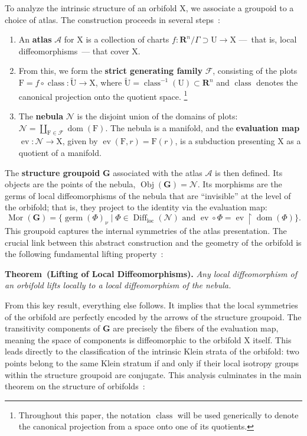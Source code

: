 \documentclass[10pt,reqno,letterpaper,twoside]{amsart}
\theoremstyle{article}
\newenvironment{theorem}[1]%
{\noindent\textbf{Theorem#1.} \it}%
{}
\newcommand{\RR}{\mathbf{R}}
\newcommand{\GG}{\mathbf{G}}
\newcommand{\cA}{{\mathcal A}}
\newcommand{\cF}{{\mathcal F}}
\newcommand{\cN}{{\mathcal N}}
\def \F{\mathrm F}
\def \U{\mathrm U}
\def \X{\mathrm X}
\DeclareMathOperator{\class}{class}
\DeclareMathOperator{\Diff}{Diff}
\DeclareMathOperator{\dom}{dom}
\DeclareMathOperator{\ev}{ev}
\DeclareMathOperator{\germ}{germ}
\newcommand{\loc}{\mathrm{loc}}
\newcommand{\Obj}{\operatorname{Obj}}
\newcommand{\Mor}{\operatorname{Mor}}
\begin{document}
  To analyze the intrinsic structure of an orbifold $\X$, we associate a groupoid to a choice of atlas. The construction proceeds in several steps~\cite{IZL18}:
  \begin{enumerate}
    \item An \textbf{atlas} $\cA$ for $\X$ is a collection of charts $f: \RR^n/\Gamma \supset \U \to \X$
    ---~that is, local diffeomorphisms~---
    that cover $\X$.
    
    \item From this,
    we form the \textbf{strict generating family} $\cF$,
    consisting of the plots $\F = f \circ \class : \tilde{\U} \to \X$,
    where $\tilde{\U} = \class^{-1}(\U) \subset \RR^n$ and $\class$ denotes the canonical projection onto the quotient space.%
    \footnote{Throughout this paper,
    the notation $\class$ will be used generically to denote the canonical projection from a space onto one of its quotients.}
    
    \item The \textbf{nebula} $\cN$ is the disjoint union of the domains of plots:
    $\cN = \coprod_{\F \in \cF} \dom(\F)$.
    The nebula is a manifold,
    and the \textbf{evaluation map} $\ev: \cN \to \X$,
    given by $\ev(\F,r) = \F(r)$,
    is a subduction presenting $\X$ as a quotient of a manifold.
  \end{enumerate}
  The \textbf{structure groupoid} $\GG$ associated with the atlas $\cA$ is then defined. Its objects are the points of the nebula, $\Obj(\GG) = \cN$. Its morphisms are the germs of local diffeomorphisms of the nebula that are ``invisible'' at the level of the orbifold; that is, they project to the identity via the evaluation map:
  \[
  \Mor(\GG) = \{ \germ(\Phi)_\nu \mid \Phi \in \Diff_\loc(\cN) \text{ and } \ev \circ \Phi = \ev \restriction \dom(\Phi) \}.
  \]
  This groupoid captures the internal symmetries of the atlas presentation. The crucial link between this abstract construction and the geometry of the orbifold is the following fundamental lifting property~\cite{IKZ10}:
  
  \begin{theorem}{~(Lifting of Local Diffeomorphisms)}
    Any local diffeomorphism of an orbifold lifts locally to a local diffeomorphism of the nebula.
  \end{theorem}
  
  From this key result, everything else follows. It implies that the local symmetries of the orbifold are perfectly encoded by the arrows of the structure groupoid. The transitivity components of $\GG$ are precisely the fibers of the evaluation map, meaning the space of components is diffeomorphic to the orbifold $\X$ itself. This leads directly to the classification of the intrinsic Klein strata of the orbifold: two points belong to the same Klein stratum if and only if their local isotropy groups within the structure groupoid are conjugate. This analysis culminates in the main theorem on the structure of orbifolds~\cite{GIZ23}:
  
\end{document}
